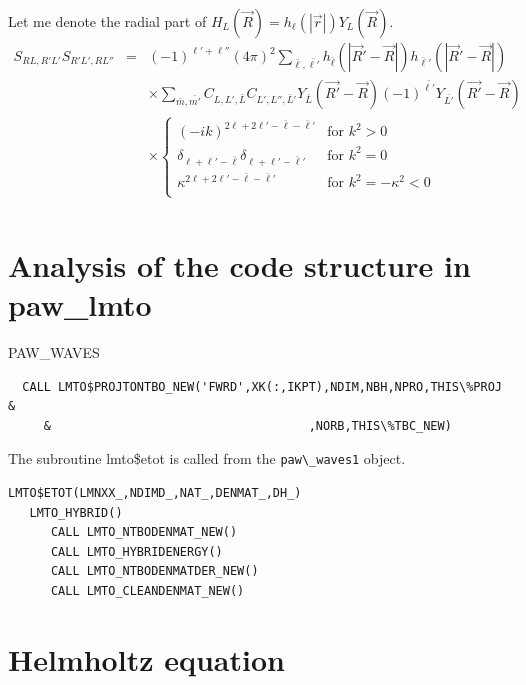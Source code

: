 \documentclass[11pt,a4paper]{report}
\begin{document}
Let me denote the radial part of
$H_L(\vec{R})=h_\ell(|\vec{r}|)Y_{L}(\vec{R})$.
\begin{eqnarray}
S_{RL,R'L'}S_{R'L',RL''}
&=&
(-1)^{\ell'+\ell''} (4\pi)^2 
\sum_{\bar{\ell},\bar{\ell'}} 
h_{\bar{\ell}}(|\vec{R}'-\vec{R}|)
h_{\bar{\ell}'}(|\vec{R}'-\vec{R}|)
\nonumber\\
&&\times\sum_{\bar{m},\bar{m'}}
C_{L,L',\bar{L}} C_{L',L'',\bar{L}'} 
Y_{\bar{L}}(\vec{R'}-\vec{R})
(-1)^{\bar{\ell'}} Y_{\bar{L'}}(\vec{R'}-\vec{R})
\nonumber\\
&&\times
\begin{cases}
(-ik)^{2\ell+2\ell'-\bar{\ell}-\bar{\ell}'}&\text{for $k^2>0$}\\
\delta_{\ell+\ell'-\bar{\ell}}\delta_{\ell+\ell'-\bar{\ell}'}
&\text{for $k^2=0$}\\
\kappa^{2\ell+2\ell'-\bar{\ell}-\bar{\ell}'}
&\text{for $k^2=-\kappa^2<0$}\\
\end{cases}
\nonumber\\
\end{eqnarray}

\section{Analysis of the code structure in paw\_lmto}


PAW\_WAVES
\begin{verbatim}
  CALL LMTO$PROJTONTBO_NEW('FWRD',XK(:,IKPT),NDIM,NBH,NPRO,THIS\%PROJ &
     &                                    ,NORB,THIS\%TBC_NEW)
\end{verbatim}



The subroutine lmto\$etot is called from the \verb|paw\_waves1| object. 
\begin{verbatim}
LMTO$ETOT(LMNXX_,NDIMD_,NAT_,DENMAT_,DH_)
   LMTO_HYBRID()
      CALL LMTO_NTBODENMAT_NEW() 
      CALL LMTO_HYBRIDENERGY()
      CALL LMTO_NTBODENMATDER_NEW()
      CALL LMTO_CLEANDENMAT_NEW()
\end{verbatim}


\newpage
\section{Helmholtz equation}
\end{document}
